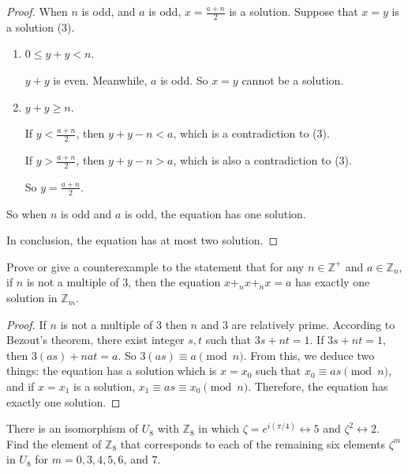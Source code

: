 \begin{proof}
    When $n$ is odd, and $a$ is odd, $x = \frac{a+n}{2}$ is a solution. Suppose that $x = y$ is a solution (3).
    \begin{enumerate}[label={\textbf{Case \arabic*}},itemindent=1cm]
        \item $0\le y + y < n$.

              $y + y$ is even. Meanwhile, $a$ is odd. So $x = y$ cannot be a solution.

        \item $y + y\ge n$.

              If $y < \frac{a+n}{2}$, then $y + y - n < a$, which is a contradiction to (3).

              If $y > \frac{a+n}{2}$, then $y + y - n > a$, which is also a contradiction to (3).

              So $y = \frac{a+n}{2}$.
    \end{enumerate}

    So when $n$ is odd and $a$ is odd, the equation has one solution.

    In conclusion, the equation has at most two solution.
\end{proof}

\newpage
\begin{exercise}
    Prove or give a counterexample to the statement that for any $n\in\mathbb{Z}^{+}$ and $a\in\mathbb{Z}_{n}$, if $n$ is not a multiple of $3$, then the equation $x {+}_{n} x {+}_{n} x = a$ has exactly one solution in $\mathbb{Z}_{m}$.
\end{exercise}

\begin{proof}
    If $n$ is not a multiple of $3$ then $n$ and $3$ are relatively prime. According to Bezout's theorem, there exist integer $s, t$ such that $3s + nt = 1$. If $3s + nt = 1$, then $3(as) + nat = a$. So $3(as)\equiv a\pmod{n}$. From this, we deduce two things: the equation has a solution which is $x = x_{0}$ such that $x_{0}\equiv as\pmod{n}$, and if $x = x_{1}$ is a solution, $x_{1}\equiv as \equiv x_{0} \pmod{n}$. Therefore, the equation has exactly one solution.
\end{proof}

\newpage
\begin{exercise}
    There is an isomorphism of $U_{8}$ with $\mathbb{Z}_{8}$ in which $\zeta = e^{i(\pi/4)}\leftrightarrow 5$ and $\zeta^{2}\leftrightarrow 2$. Find the element of $\mathbb{Z}_{8}$ that corresponds to each of the remaining six elements $\zeta^{m}$ in $U_{8}$ for $m = 0, 3, 4, 5, 6$, and $7$.
\end{exercise}

